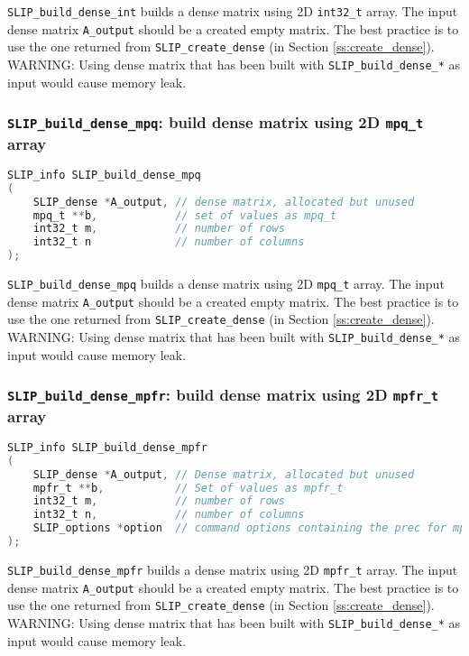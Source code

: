 \documentclass[12pt]{article}
\theoremstyle{definition}
\begin{document}
\verb|SLIP_build_dense_int| builds a dense matrix using 2D \verb|int32_t| array. The input dense matrix \verb|A_output| should be a created empty matrix. The best practice is to use the one returned from \verb|SLIP_create_dense| (in Section \ref{ss:create_dense}). WARNING: Using dense matrix that has been built with \verb|SLIP_build_dense_*| as input would cause memory leak.

\cprotect\subsubsection{\verb|SLIP_build_dense_mpq|: build dense matrix using 2D \verb|mpq_t| array}\label{s:user:build_dense_mpq}
\begin{lstlisting}[language=C,frame=single]
SLIP_info SLIP_build_dense_mpq
(
    SLIP_dense *A_output, // dense matrix, allocated but unused
    mpq_t **b,            // set of values as mpq_t
    int32_t m,            // number of rows
    int32_t n             // number of columns
);
\end{lstlisting}

\verb|SLIP_build_dense_mpq| builds a dense matrix using 2D \verb|mpq_t| array. The input dense matrix \verb|A_output| should be a created empty matrix. The best practice is to use the one returned from \verb|SLIP_create_dense| (in Section \ref{ss:create_dense}). WARNING: Using dense matrix that has been built with \verb|SLIP_build_dense_*| as input would cause memory leak.

\cprotect\subsubsection{\verb|SLIP_build_dense_mpfr|: build dense matrix using 2D \verb|mpfr_t| array}\label{s:user:build_dense_mpfr}
\begin{lstlisting}[language=C,frame=single]
SLIP_info SLIP_build_dense_mpfr
(
    SLIP_dense *A_output, // Dense matrix, allocated but unused
    mpfr_t **b,           // Set of values as mpfr_t
    int32_t m,            // number of rows
    int32_t n,            // number of columns
    SLIP_options *option  // command options containing the prec for mpfr
);
\end{lstlisting}

\verb|SLIP_build_dense_mpfr| builds a dense matrix using 2D \verb|mpfr_t| array. The input dense matrix \verb|A_output| should be a created empty matrix. The best practice is to use the one returned from \verb|SLIP_create_dense| (in Section \ref{ss:create_dense}). WARNING: Using dense matrix that has been built with \verb|SLIP_build_dense_*| as input would cause memory leak.
\end{document}
